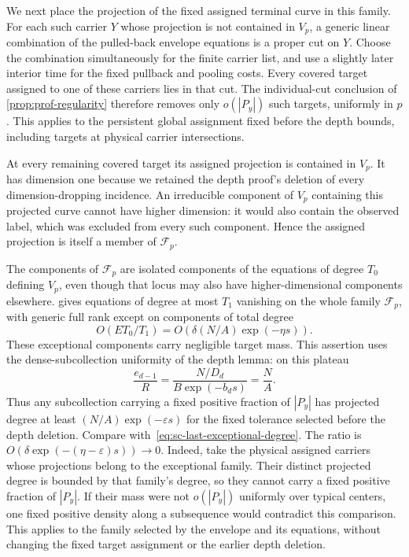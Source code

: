 We next place the projection of the fixed assigned terminal curve in this family.  For each such carrier $Y$ whose projection is not contained in $V_p$, a generic linear combination of the pulled-back envelope equations is a proper cut on $Y$.  Choose the combination simultaneously for the finite carrier list, and use a slightly later interior time for the fixed pullback and pooling costs.  Every covered target assigned to one of these carriers lies in that cut.  The individual-cut conclusion of \cref{prop:prof-regularity} therefore removes only $o(|P_y|)$ such targets, uniformly in $p$.  This applies to the persistent global assignment fixed before the depth bounds, including targets at physical carrier intersections.

At every remaining covered target its assigned projection is contained in $V_p$. It has dimension one because we retained the depth proof's deletion of every dimension-dropping incidence.  An irreducible component of $V_p$ containing this projected curve cannot have higher dimension: it would also contain the observed label, which was excluded from every such component.  Hence the assigned projection is itself a member of $\mathcal{F}_p$.

The components of $\mathcal{F}_p$ are isolated components of the equations of degree $T_0$ defining $V_p$, even though that locus may also have higher-dimensional components elsewhere.  gives equations of degree at most $T_1$ vanishing on the whole family $\mathcal{F}_p$, with generic full rank except on components of total degree
\begin{equation}\label{eq:sc-last-exceptional-degree}
 O(E T_0/T_1)=O(\delta(N/A)\exp(-\eta s)).
\end{equation}
These exceptional components carry negligible target mass.  This assertion uses the dense-subcollection uniformity of the depth lemma: on this plateau
\[
 \frac{e_{d-1}}{R}
 =\frac{N/D_d}{B\exp(-b_d s)}=\frac NA.
\]
Thus any subcollection carrying a fixed positive fraction of $|P_y|$ has projected degree at least $(N/A)\exp(-\varepsilon s)$ for the fixed tolerance selected before the depth deletion.  Compare with~\eqref{eq:sc-last-exceptional-degree}.  The ratio is $O(\delta\exp(- (\eta-\varepsilon)s))\to0$. Indeed, take the physical assigned carriers whose projections belong to the exceptional family.  Their distinct projected degree is bounded by that family's degree, so they cannot carry a fixed positive fraction of $|P_y|$. If their mass were not $o(|P_y|)$ uniformly over typical centers, one fixed positive density along a subsequence would contradict this comparison. This applies to the family selected by the envelope and its equations, without changing the fixed target assignment or the earlier depth deletion.

